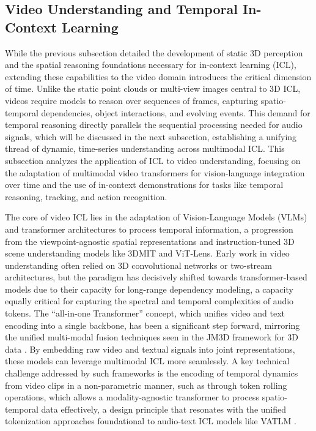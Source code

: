 \documentclass[11pt]{article}
\begin{document}
\subsection{Video Understanding and Temporal In-Context Learning}

While the previous subsection detailed the development of static 3D perception and the spatial reasoning foundations necessary for in-context learning (ICL), extending these capabilities to the video domain introduces the critical dimension of time. Unlike the static point clouds or multi-view images central to 3D ICL, videos require models to reason over sequences of frames, capturing spatio-temporal dependencies, object interactions, and evolving events. This demand for temporal reasoning directly parallels the sequential processing needed for audio signals, which will be discussed in the next subsection, establishing a unifying thread of dynamic, time-series understanding across multimodal ICL. This subsection analyzes the application of ICL to video understanding, focusing on the adaptation of multimodal video transformers for vision-language integration over time and the use of in-context demonstrations for tasks like temporal reasoning, tracking, and action recognition.

The core of video ICL lies in the adaptation of Vision-Language Models (VLMs) and transformer architectures to process temporal information, a progression from the viewpoint-agnostic spatial representations and instruction-tuned 3D scene understanding models like 3DMIT and ViT-Lens. Early work in video understanding often relied on 3D convolutional networks or two-stream architectures, but the paradigm has decisively shifted towards transformer-based models due to their capacity for long-range dependency modeling, a capacity equally critical for capturing the spectral and temporal complexities of audio tokens. The ``all-in-one Transformer'' concept, which unifies video and text encoding into a single backbone, has been a significant step forward, mirroring the unified multi-modal fusion techniques seen in the JM3D framework for 3D data \cite{ref264}. By embedding raw video and textual signals into joint representations, these models can leverage multimodal ICL more seamlessly. A key technical challenge addressed by such frameworks is the encoding of temporal dynamics from video clips in a non-parametric manner, such as through token rolling operations, which allows a modality-agnostic transformer to process spatio-temporal data effectively, a design principle that resonates with the unified tokenization approaches foundational to audio-text ICL models like VATLM \cite{ref264}.
\end{document}
